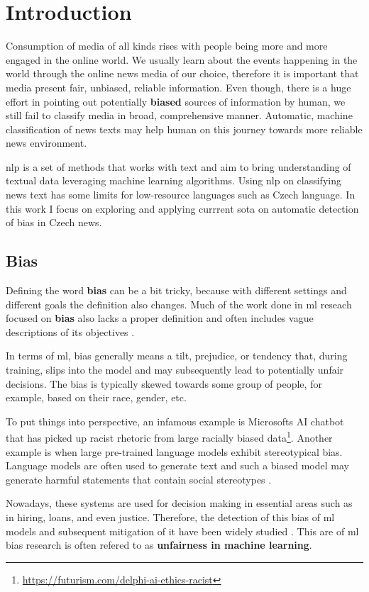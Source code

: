 \chapter{Introduction}
Consumption of media of all kinds rises with people being more and more engaged in the online world. We usually learn about the events happening in the world through the online news media of our choice, therefore it is important that media present fair, unbiased, reliable information. Even though, there is a huge effort in pointing out potentially \textbf{biased} sources of information by human, we still fail to classify media in broad, comprehensive manner. Automatic, machine classification of news texts may help human on this journey towards more reliable news environment.

\gls{nlp} is a set of methods that works with text and aim to bring understanding of textual data leveraging machine learning algorithms. Using \gls{nlp} on classifying news text has some limits for low-resource languages such as Czech language. In this work I focus on exploring and applying currrent \gls{sota} on automatic detection of bias in Czech news.


\section{Bias}
Defining the word \textbf{bias} can be a bit tricky, because with different settings and different goals the definition also changes. Much of the work done in \gls{ml} reseach focused on \textbf{bias} also lacks a proper definition and often includes vague descriptions of its objectives \cite{blodgett2020language}. 

In terms of \Gls{ml}, bias generally means a tilt, prejudice, or tendency that, during training, slips into the model and may subsequently lead to potentially unfair decisions. The bias is typically skewed towards some group of people, for example, based on their race, gender, etc. 

To put things into perspective, an infamous example is Microsofts AI chatbot that has picked up racist rhetoric from large racially biased data\footnote{\url{https://futurism.com/delphi-ai-ethics-racist}}. Another example is when large pre-trained language models exhibit stereotypical bias. Language models are often used to generate text and such a biased model may generate harmful statements that contain social stereotypes \cite{nadeem2021stereoset}.

Nowadays, these systems are used for decision making in essential areas such as in hiring, loans, and even justice. Therefore, the detection of this bias of \Gls{ml} models and subsequent mitigation of it have been widely studied \cite{blodgett2020language}. This are of \gls{ml} bias research is often refered to as \textbf{unfairness in machine learning}.


